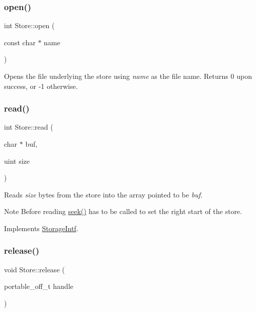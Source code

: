 \subsubsection{\texorpdfstring{open()}{open()}}
{\footnotesize\ttfamily int Store\+::open (\begin{DoxyParamCaption}\item[{const char $\ast$}]{name }\end{DoxyParamCaption})}

Opens the file underlying the store using {\itshape name} as the file name. Returns 0 upon success, or -\/1 otherwise. \mbox{\label{class_store_a02df7a98367838e436f8f8b3367016d1}} 
\subsubsection{\texorpdfstring{read()}{read()}}
{\footnotesize\ttfamily int Store\+::read (\begin{DoxyParamCaption}\item[{char $\ast$}]{buf,  }\item[{uint}]{size }\end{DoxyParamCaption})\hspace{0.3cm}{\ttfamily [virtual]}}

Reads {\itshape size} bytes from the store into the array pointed to be {\itshape buf}. \begin{DoxyNote}{Note}
Before reading \mbox{\hyperlink{class_store_ad77053023f371abfc70f76ee2a14c377}{seek()}} has to be called to set the right start of the store. 
\end{DoxyNote}


Implements \mbox{\hyperlink{class_storage_intf_a125b99d1511364f4fe49709feec46bb4}{Storage\+Intf}}.

\mbox{\label{class_store_aed5b8a83aa15dfc3f7f1ca930a4d2583}} 
\subsubsection{\texorpdfstring{release()}{release()}}
{\footnotesize\ttfamily void Store\+::release (\begin{DoxyParamCaption}\item[{portable\+\_\+off\+\_\+t}]{handle }\end{DoxyParamCaption})}


